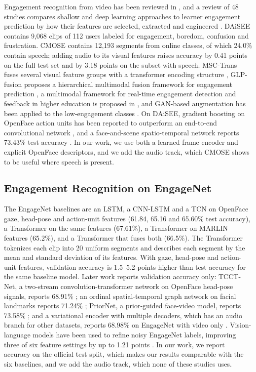 \documentclass[journal]{IEEEtran}
\begin{document}
Engagement recognition from video has been reviewed in \cite{qarbal2025review}, and a review of 48 studies compares shallow and deep learning approaches to learner engagement prediction by how their features are selected, extracted and engineered \cite{theophilus2026review}. DAiSEE \cite{gupta2016daisee} contains 9,068 clips of 112 users labeled for engagement, boredom, confusion and frustration. CMOSE \cite{wu2024cmose} contains 12,193 segments from online classes, of which 24.0\% contain speech; adding audio to its visual features raises accuracy by 0.41 points on the full test set and by 3.18 points on the subset with speech. MSC-Trans fuses several visual feature groups with a transformer encoding structure \cite{xie2025msctrans}, GLP-fusion proposes a hierarchical multimodal fusion framework for engagement prediction \cite{qin2026glpfusion}, a multimodal framework for real-time engagement detection and feedback in higher education is proposed in \cite{zhao2026multimodal}, and GAN-based augmentation has been applied to the low-engagement classes \cite{yulius2025gan}. On DAiSEE, gradient boosting on OpenFace action units has been reported to outperform an end-to-end convolutional network \cite{das2025optimizing}, and a face-and-scene spatio-temporal network reports 73.43\% test accuracy \cite{gothwal2025vibednet}. In our work, we use both a learned frame encoder and explicit OpenFace descriptors, and we add the audio track, which CMOSE shows to be useful where speech is present.

\subsection{Engagement Recognition on EngageNet}

The EngageNet baselines \cite{singh2023engagenet} are an LSTM, a CNN-LSTM and a TCN on OpenFace gaze, head-pose and action-unit features (61.84, 65.16 and 65.60\% test accuracy), a Transformer on the same features (67.61\%), a Transformer on MARLIN features (65.2\%), and a Transformer that fuses both (66.5\%). The Transformer tokenizes each clip into 20 uniform segments and describes each segment by the mean and standard deviation of its features. With gaze, head-pose and action-unit features, validation accuracy is 1.5--5.2 points higher than test accuracy for the same baseline model. Later work reports validation accuracy only: TCCT-Net, a two-stream convolution-transformer network on OpenFace head-pose signals, reports 68.91\% \cite{vedernikov2024tcct}; an ordinal spatial-temporal graph network on facial landmarks reports 71.24\% \cite{abedi2024stgcn}; PriorNet, a prior-guided face-video model, reports 73.58\% \cite{vedernikov2026priornet}; and a variational encoder with multiple decoders, which has an audio branch for other datasets, reports 68.98\% on EngageNet with video only \cite{augusma2026vemd}. Vision-language models have been used to refine noisy EngageNet labels, improving three of six feature settings by up to 1.21 points \cite{vedernikov2025vlmnoise}. In our work, we report accuracy on the official test split, which makes our results comparable with the six baselines, and we add the audio track, which none of these studies uses.
\end{document}
